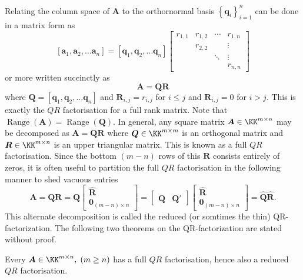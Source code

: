 Relating the column space of $\bm{A}$ to the orthornormal basis $\left\{ \bm{q}_{i} \right\}_{i=1}^{n}$ can be done in a matrix form as
\[
    \left[ \bm{a}_1 , \bm{a}_2 , \ldots \bm{a}_n \right] =
    \left[ \bm{q}_1 , \bm{q}_2 , \ldots \bm{q}_n \right]
    \begin{bmatrix}
        r_{1,1} & r_{1,2} & \cdots & r_{1,n} \\
                & r_{2,2} &        & \vdots  \\
                &         & \ddots & \vdots  \\
                &         &        & r_{n,n}
    \end{bmatrix}
\]
or more written succinctly as
\begin{equation}\label{eq: QR_factorisation}
    \bm{A} = \bm{Q} \bm{R}
\end{equation}
where $\bm{Q} = \left[ \bm{q}_1 , \bm{q}_2 , \ldots \bm{q}_n \right]$ and $\bm{R}_{i,j} = r_{i,j}$ for $i \leq j$ and $\bm{R}_{i,j} = 0$ for $i > j$. This is exactly the $QR$ factorisation for a full rank matrix. Note that $\operatorname{Range} \left( \bm{A} \right) = \operatorname{Range} \left( \bm{Q} \right)$. In general, any square matrix  $\bm{A} \in \KK^{m \times n}$ may be decomposed as $\bm{A} = \bm{Q} \bm{R}$ where $\bm{Q} \in \KK^{m \times m}$ is an orthogonal matrix and $\bm{R} \in \KK^{m \times n}$ is an upper triangular matrix. This is known as a full $QR$ factorisation. Since the bottom $(m-n)$ rows of this $\bm{R}$ consists entirely of zeros, it is often useful to partition the full $QR$ factorisation in the following manner to shed vacuous entries
\[
    \bm{A} = \bm{Q} \bm{R} = \bm{Q}
    \begin{bmatrix}
        \hat{\bm{R}} \\
        \bm{0}_{(m-n) \times n}
    \end{bmatrix}
    =
    \begin{bmatrix}
        \hat{\bm{Q}} & \bm{Q}'
    \end{bmatrix}
    \begin{bmatrix}
        \hat{\bm{R}} \\
        \bm{0}_{(m-n) \times n}
    \end{bmatrix}
    = \hat{\bm{Q}} \hat{\bm{R}}.
\]
This alternate decomposition is called the reduced (or somtimes the thin) QR-factorization. The following two theorems on the QR-factorization are stated without proof.

\begin{thm} \label{theorem: QR_general_existence}
    Every $\bm{A} \in \KK^{m \times n}, \; (m \geq n)$ has a full $QR$ factorisation, hence also a reduced $QR$ factorisation.
    \cite{TrefethenLloydN.LloydNicholas1997Nla/}
\end{thm}

